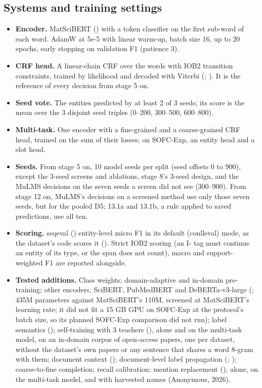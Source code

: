 \documentclass[11pt,a4paper]{article}
\providecommand{\tightlist}{\setlength{\itemsep}{0pt}\setlength{\parskip}{0pt}}
\begin{document}
\hypertarget{systems-and-training-settings}{%
\subsection{Systems and training settings}\label{systems-and-training-settings}}

\begin{itemize}
\tightlist
\item
  \textbf{Encoder.} MatSciBERT (\citealp{gupta2022matscibert}) with a token classifier on
  the first sub-word of each word. AdamW at 5e-5 with linear warm-up,
  batch size 16, up to 20 epochs, early stopping on validation F1
  (patience 3).
\item
  \textbf{CRF head.} A linear-chain CRF over the words with IOB2 transition
  constraints, trained by likelihood and decoded with Viterbi
  (\citealp{lafferty2001conditional}; \citealp{lample2016neural}). It is the reference of
  every decision from stage 5 on.
\item
  \textbf{Seed vote.} The entities predicted by at least 2 of 3 seeds; its
  score is the mean over the 3 disjoint seed triples (0--200, 300--500,
  600--800).
\item
  \textbf{Multi-task.} One encoder with a fine-grained and a coarse-grained CRF
  head, trained on the sum of their losses; on SOFC-Exp, an entity head
  and a slot head.
\item
  \textbf{Seeds.} From stage 5 on, 10 model seeds per split (seed offsets 0 to
  900), except the 3-seed screens and ablations, stage 8's 3-seed design,
  and the MuLMS decisions on the seven seeds a screen did not see
  (300--900). From stage 12 on, MuLMS's decisions on a screened method use
  only those seven seeds, but for the pooled D5; 13.1a and 13.1b, a rule
  applied to saved predictions, use all ten.
\item
  \textbf{Scoring.} seqeval (\citealp{nakayama2018seqeval}) entity-level micro F1 in its
  default (conlleval) mode, as the dataset's code scores it
  (\citealp{tjongkimsang2003introduction}). Strict IOB2 scoring (an I- tag must
  continue an entity of its type, or the span does not count), macro and
  support-weighted F1 are reported alongside.
\item
  \textbf{Tested additions.} Class weights; domain-adaptive and in-domain
  pre-training; other encoders, SciBERT, PubMedBERT and DeBERTa-v3-large
  (\citealp{he2023debertav3}; 435M parameters against MatSciBERT's 110M, screened at
  MatSciBERT's learning rate; it did not fit a 15 GB GPU on SOFC-Exp at
  the protocol's batch size, so its planned SOFC-Exp comparison did not
  run); label semantics (\citealp{ma2022label}); self-training with 3 teachers
  (\citealp{liang2020bond}), alone and on the multi-task model, on an in-domain
  corpus of open-access papers, one per dataset, without the dataset's own
  papers or any sentence that shares a word 8-gram with them; document
  context (\citealp{schweter2020flert}); document-level label propagation
  (\citealp{gale1992one}; \citealp{krishnan2006effective}); coarse-to-fine completion; recall
  calibration; mention replacement (\citealp{dai2020analysis}), alone, on the
  multi-task model, and with harvested names (Anonymous, 2026).
\end{itemize}
\end{document}
